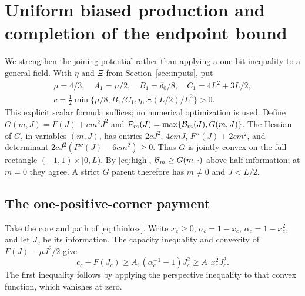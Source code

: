 \section{Uniform biased production and completion of the endpoint bound}
\label{sec:production}
We strengthen the joining potential rather than applying a one-bit
inequality to a general field. With $\eta$ and $\Xi$ from
Section~\ref{sec:inputs}, put
\begin{equation}\label{eq:c}
 \begin{gathered}
\mu=4/3,\quad A_1=\mu/2,\quad B_1=\delta_0/8,\quad
 C_1=4L^2+3L/2,\\
 c=\tfrac12\min\{\mu/8,B_1/C_1,\eta,\Xi(L/2)/L^2\}>0.
\end{gathered}
\end{equation}
This explicit scalar formula suffices; no numerical optimization is used.
Define $G(m,J)=F(J)+cm^2J^2$ and
$\mathcal P_m(J)=\max\{\mathcal B_m(J),G(m,J)\}$.
The Hessian of $G$, in variables $(m,J)$, has entries
$2cJ^2$, $4cmJ$, $F''(J)+2cm^2$, and determinant
$2cJ^2(F''(J)-6cm^2)\ge0$. Thus $G$ is jointly convex on the
full rectangle $(-1,1)\times[0,L)$.
By \eqref{eq:high}, $\mathcal B_m\ge G(m,\cdot)$ above half information;
at $m=0$ they agree. A strict $G$ parent therefore has
$m\ne0$ and $J<L/2$.

\subsection{The one-positive-corner payment}
Take the core and path of \eqref{eq:thinloss}. Write $x_c\ge0$,
$\sigma_c=1-x_c$, $\alpha_c=1-x_c^2$, and let $J_c$ be its information.
The capacity inequality and convexity of $F(J)-\mu J^2/2$ give
\begin{equation}\label{eq:corebias}
 c_c-F(J_c)\ge A_1(\alpha_c^{-1}-1)J_c^2
 \ge A_1x_c^2J_c^2.
\end{equation}
The first inequality follows by applying the perspective inequality to
that convex function, which vanishes at zero.

